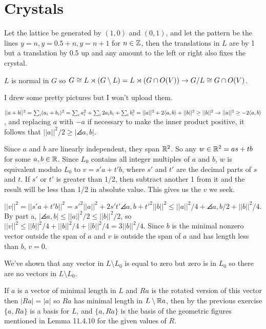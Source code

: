 \documentclass[11pt, oneside]{article}   	%
\begin{document}
\section{Crystals}
\be
\item Let the lattice be generated by $(1, 0)$ and $(0, 1)$, and let the pattern be the lines $y = n, y = 0.5 + n, y = n + 1$ for $n \in \mathbb{Z}$, then the translations in $L$ are by 1 but a translation by 0.5 up and any amount to the left or right also fixes the crystal.
\item $L$ is normal in $G$ so $G \cong L \rtimes (G \setminus L) = L \rtimes (G \cap O(V)) \rightarrow G/L \cong G \cap O(V)$.
\item I drew some pretty pictures but I won't upload them.
\item \be
\item $||a+b||^2 = \sum_i(a_i+b_i)^2 = \sum_ia_i^2 + \sum_i2a_ib_i + \sum_i b_i^2 = ||a||^2 + 2\langle a, b \rangle + ||b||^2 \ge ||b||^2 \rightarrow ||a||^2 \ge -2\langle a, b \rangle$, and replacing $a$ with $-a$ if necessary to make the inner product positive, it follows that $||a||^2 / 2 \ge |\angles{a, b}|$.
\item Since $a$ and $b$ are linearly independent, they span $\mathbb{R}^2$. So any $w \in \mathbb{R}^2 = as + tb$ for some $a, b \in \mathbb{R}$. Since $L_0$ contains all integer multiples of $a$ and $b$, $w$ is equivalent modulo $L_0$ to $v = s'a + t'b$, where $s'$ and $t'$ are the decimal parts of $s$ and $t$. If $s'$ or $t'$ is greater than 1/2, then subtract another 1 from it and the result will be less than 1/2 in absolute value. This gives us the $v$ we seek.
\item $||v||^2 = ||s'a + t'b||^2 = s'^2||a||^2 + 2s't'\angles{a, b} + t'^2 ||b||^2 \le ||a||^2/4 + \angles{a, b}/2 + ||b||^2 / 4.$ By part a, $|\angles{a, b}| \le ||a||^2/2 \le ||b||^2/2$, so $||v||^2 \le ||b||^2 / 4 + ||b||^2 / 4 + ||b||^2/4 = 3||b||^2/4.$ Since $b$ is the minimal nonzero vector outside the span of $a$ and $v$ is outside the span of $a$ and has length less than $b$, $v = 0$.
\item We've shown that any vector in $L \setminus L_0$ is equal to zero but zero is in $L_0$ so there are no vectors in $L \setminus L_0$.
\ee
\item If $a$ is a vector of minimal length in $L$ and $Ra$ is the rotated version of this vector then $|Ra| = |a|$ so $Ra$ has minimal length in $L \setminus \mathbb{R} a$, then by the previous exercise $\{a, Ra\}$ is a basis for $L$, and $\{a, Ra\}$ is the basis of the geometric figures mentioned in Lemma 11.4.10 for the given values of $R$.
\end{document}
